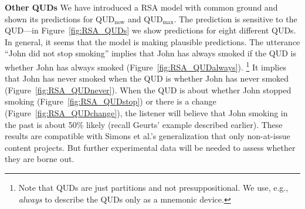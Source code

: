 
\vspace{1ex}

\noindent \textbf{Other QUDs} \quad 
We have introduced a RSA model with common ground and shown its
 predictions for QUD$_\textrm{now}$ and QUD$_\textrm{max}$.
The prediction is sensitive to the QUD---in Figure~\ref{fig:RSA_QUDs} we show predictions for eight different QUDs.
In general, it seems that the model is making plausible predictions. 
The utterance ``John did not stop smoking'' implies that John has always smoked if the QUD is whether John has always smoked (Figure~\ref{fig:RSA_QUDalways}).%
\footnote{Note that QUDs are just partitions and not presuppositional. We use, e.g.,
 \emph{always} to describe the QUDs only as a mnemonic device. }
It implies that John has never smoked when the QUD is whether John has never smoked (Figure~\ref{fig:RSA_QUDnever}). 
When the QUD is about whether John stopped smoking (Figure~\ref{fig:RSA_QUDstop}) 
 or there is a change (Figure~\ref{fig:RSA_QUDchange}), the listener will believe that John 
 smoking in the past is about 50\% likely (recall Geurts' example described earlier).
These results are compatible with Simons et al.'s generalization that only non-at-issue content projects.
But further experimental data will be needed to assess whether they are borne out.

